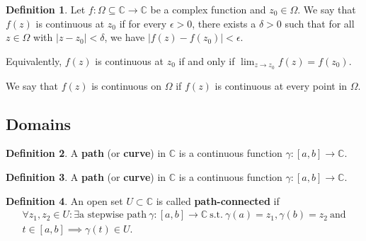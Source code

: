 \documentclass[12pt,openany]{book}
\theoremstyle{definition}
\newtheorem{definition}{Definition}[chapter]
\newcommand{\C}{\mathbb{C}}
\begin{document}
	\begin{tcolorbox}[colback=white,colframe=defcolor,arc=5pt,title={\color{white}\bf Continuity of Complex function}]
		\begin{definition}
			Let $f: \Omega \subseteq \mathbb{C} \rightarrow \mathbb{C}$ be a complex function and $z_0 \in \Omega$. We say that $f(z)$ is continuous at $z_0$ if for every $\epsilon > 0$, there exists a $\delta > 0$ such that for all $z \in \Omega$ with $|z - z_0| < \delta$, we have $|f(z) - f(z_0)| < \epsilon$.
			
			Equivalently, $f(z)$ is continuous at $z_0$ if and only if $\lim_{z \to z_0} f(z) = f(z_0)$.
			
			We say that $f(z)$ is continuous on $\Omega$ if $f(z)$ is continuous at every point in $\Omega$.
		\end{definition}
	\end{tcolorbox}
	
	\subsection{Domains}
	\begin{tcolorbox}[title=Path; Curve; Contour;]
		\begin{definition}
			A \textbf{path} (or \textbf{curve}) in $\C$ is a continuous function $\gamma:[a,b]\to\C$.
		\end{definition}
	\end{tcolorbox}
	
	\begin{tcolorbox}[title=Stepwise Path;]
		\begin{definition}
			A \textbf{path} (or \textbf{curve}) in $\C$ is a continuous function $\gamma:[a,b]\to\C$.
		\end{definition}
	\end{tcolorbox}
	
	\begin{tcolorbox}[title=Path-connected;]
		\begin{definition}
			An open set $U\subset\C$ is called \textbf{path-connected} if \begin{align*}
				\forall z_1,z_2\in U:\exists\text{a stepwise path}\ \gamma:[a,b]\to\C\ \text{s.t.}\ \gamma(a)=z_1,\gamma(b)=z_2\ \text{and}\\
				t\in[a,b]\implies\gamma(t)\in U.
			\end{align*}
		\end{definition}
	\end{tcolorbox}
	\fi
	
\end{document}

